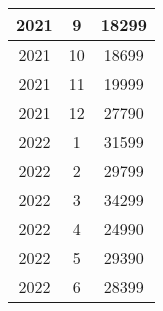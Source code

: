 \documentclass{bmstu}
\begin{document}
\begin{table}[H]
\begin{center}
\begin{tabular}{| c | c | c |}
			2021 & 9 & 18299 \\
			
			\hline
			
			2021 & 10 & 18699 \\
			
			\hline
			
			2021 & 11 & 19999 \\
			
			\hline
			
			2021 & 12 & 27790 \\
			
			\hline
			
			2022 & 1 & 31599 \\
			
			\hline
			
			2022 & 2 & 29799 \\
			
			\hline
			
			2022 & 3 & 34299 \\
			
			\hline
			
			2022 & 4 & 24990 \\
			
			\hline
			
			2022 & 5 & 29390 \\
			
			\hline
			
			2022 & 6 & 28399 \\
			
			\hline
		\end{tabular}
	\end{center}
\end{table}
\end{document}
